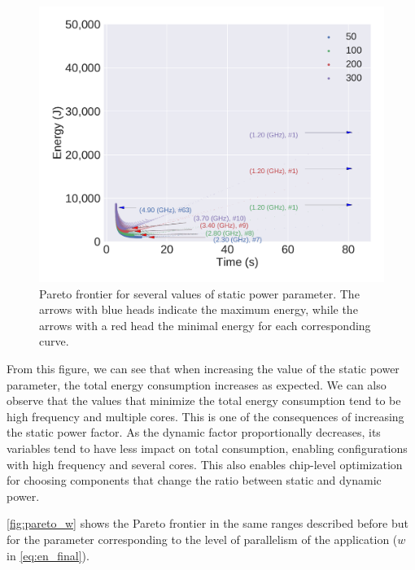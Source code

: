 \begin{figure}[H]
	\includegraphics[width=\columnwidth]{models/figures/analisys/pareto_static_high.pdf}
	\caption{Pareto frontier for several values of static power parameter. The arrows with blue heads indicate the maximum energy, while the arrows with a red head the minimal energy for each corresponding curve.}%
	\label{fig:pareto_static}
\end{figure}

From this figure, we can see that when increasing the value of the static power parameter, the total energy consumption increases as expected. We can also observe that the values that minimize the total energy consumption tend to be high frequency and multiple cores. This is one of the consequences of increasing the static power factor. As the dynamic factor proportionally decreases, its variables tend to have less impact on total consumption, enabling configurations with high frequency and several cores. This also enables chip-level optimization for choosing components that change the ratio between static and dynamic power.


\cref{fig:pareto_w} shows the Pareto frontier in the same ranges described before but for the parameter corresponding to the level of parallelism of the application ($w$ in  \cref{eq:en_final}).

